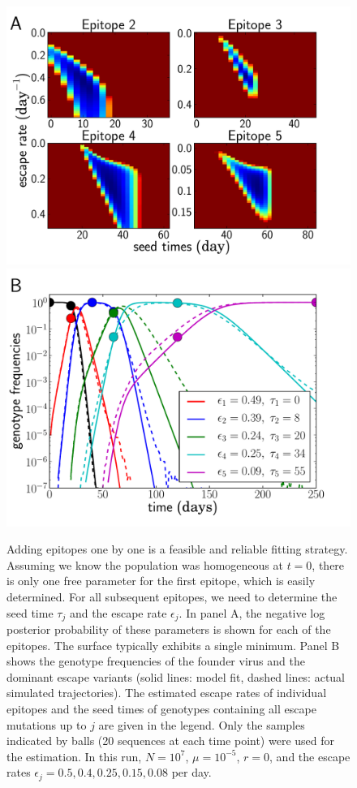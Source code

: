\documentclass{frontiers}
\newcommand{\fcoeff}{\epsilon}
\begin{document}
\begin{figure}[htp]
\begin{center}
  \includegraphics[width=0.45\columnwidth]{figures_manuscript/sequential_LH_final_refined.pdf}
  \includegraphics[width=0.45\columnwidth]{figures_manuscript/sequential_traj_refined_log.pdf}
  \caption[labelInTOC]{Adding epitopes one by one is a feasible and
    reliable fitting strategy. Assuming we know the population was
    homogeneous at $t=0$, there is only one free parameter for the first
    epitope, which is easily determined.  For all subsequent epitopes,
    we need to determine the seed time $\tau_j$ and the escape rate
    $\fcoeff_j$. In panel A, the negative log posterior probability of
    these parameters is shown for each of the epitopes. The surface
    typically exhibits a single minimum.  Panel B shows the genotype
    frequencies of the founder virus and the dominant escape variants 
    (solid lines: model fit, dashed lines: actual
    simulated trajectories). The estimated escape rates of individual
    epitopes and the seed times of genotypes containing all escape mutations up to
    $j$ are given in the legend. Only the samples indicated by balls (20
    sequences at each time point) were used for the estimation. In this
    run, $N = 10^7$, $\mu = 10^{-5}$, $r = 0$, and the escape rates
    $\fcoeff_j = 0.5, 0.4, 0.25, 0.15, 0.08$ per day.}
  \label{fig:sequential_fitting}
\end{center}
\end{figure}
\end{document}
